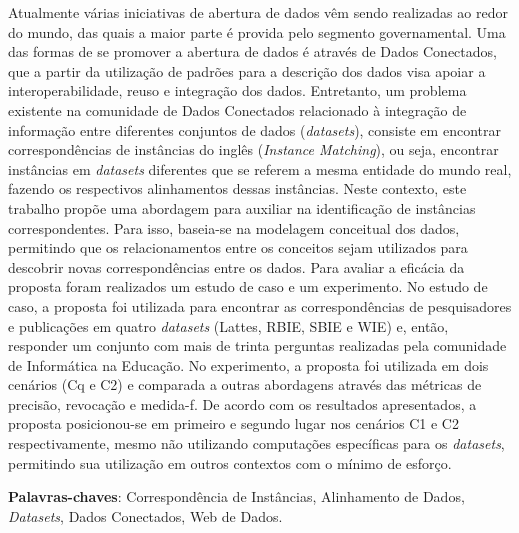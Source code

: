 
\setlength{\absparsep}{18pt} %
\begin{resumo}
Atualmente várias iniciativas de abertura de dados vêm sendo realizadas ao redor do mundo, das quais a maior parte é provida pelo segmento governamental. Uma das formas de se promover a abertura de dados é através de Dados Conectados, que a partir da utilização de padrões para a descrição dos dados visa apoiar a interoperabilidade, reuso e integração dos dados. Entretanto, um problema existente na comunidade de Dados Conectados relacionado à integração de informação entre diferentes conjuntos de dados (\textit{datasets}), consiste em encontrar correspondências de instâncias do inglês (\textit{Instance Matching}), ou seja, encontrar instâncias em \textit{datasets} diferentes que se referem a mesma entidade do mundo real, fazendo os respectivos alinhamentos dessas instâncias. Neste contexto, este trabalho propõe uma abordagem para auxiliar na identificação de instâncias correspondentes. Para isso, baseia-se na modelagem conceitual dos dados, permitindo que os relacionamentos entre os conceitos sejam utilizados para descobrir novas correspondências entre os dados. Para avaliar a eficácia da proposta foram realizados um estudo de caso e um experimento.  No estudo de caso, a proposta foi utilizada para encontrar as correspondências de pesquisadores e publicações em quatro \textit{datasets} (Lattes, RBIE, SBIE e WIE) e, então, responder um conjunto com mais de trinta perguntas realizadas pela comunidade de Informática na Educação. No experimento, a proposta foi utilizada em dois cenários (Cq e C2) e comparada a outras abordagens através das métricas de precisão, revocação e medida-f. De acordo com os resultados apresentados, a proposta posicionou-se em primeiro e segundo lugar nos cenários C1 e C2 respectivamente, mesmo não utilizando computações específicas para os \textit{datasets}, permitindo sua utilização em outros contextos com o mínimo de esforço.
% 
% 

 \textbf{Palavras-chaves}: Correspondência de Instâncias, Alinhamento de Dados, \textit{Datasets}, Dados Conectados, Web de Dados.
\end{resumo}

%
% 
